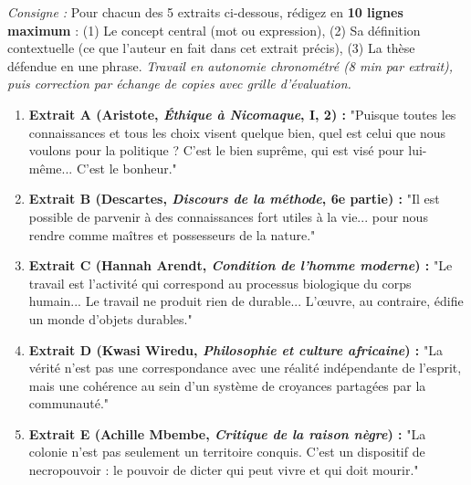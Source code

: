 \documentclass[11pt]{article}
\newcommand{\cle}[1]{{\popxbold\color{popdark}#1}}
\newcounter{popsec}
\newcounter{popsub}
\newcommand{\courssub}[1]{%
  \stepcounter{popsub}%
  \par\vspace{9pt}\noindent{\popxbold\fontsize{11.5}{13}\selectfont\color{popink}{\color{poporange}\thepopsec.\thepopsub}\hspace{6pt}#1}\par\nopagebreak\vspace{4pt}
}
\begin{document}
\courssub{Je m'entraîne}

\begin{exercice}
\emph{Consigne :} Pour chacun des 5 extraits ci-dessous, rédigez en \textbf{10 lignes maximum} : (1) Le \cle{concept central} (mot ou expression), (2) Sa \cle{définition contextuelle} (ce que l'auteur en fait dans cet extrait précis), (3) La \cle{thèse} défendue en une phrase. \emph{Travail en autonomie chronométré (8 min par extrait), puis correction par échange de copies avec grille d'évaluation.}

\begin{enumerate}
    \item \textbf{Extrait A (Aristote, \emph{Éthique à Nicomaque}, I, 2) :} "Puisque toutes les connaissances et tous les choix visent quelque bien, quel est celui que nous voulons pour la politique ? C'est le bien suprême, qui est visé pour lui-même... C'est le bonheur."
    \item \textbf{Extrait B (Descartes, \emph{Discours de la méthode}, 6e partie) :} "Il est possible de parvenir à des connaissances fort utiles à la vie... pour nous rendre comme \cle{maîtres et possesseurs de la nature}."
    \item \textbf{Extrait C (Hannah Arendt, \emph{Condition de l'homme moderne}) :} "Le travail est l'activité qui correspond au processus biologique du corps humain... Le travail ne produit rien de durable... L'œuvre, au contraire, édifie un monde d'objets durables."
    \item \textbf{Extrait D (Kwasi Wiredu, \emph{Philosophie et culture africaine}) :} "La vérité n'est pas une correspondance avec une réalité indépendante de l'esprit, mais une \cle{cohérence} au sein d'un système de croyances partagées par la communauté."
    \item \textbf{Extrait E (Achille Mbembe, \emph{Critique de la raison nègre}) :} "La \cle{colonie} n'est pas seulement un territoire conquis. C'est un dispositif de \cle{necropouvoir} : le pouvoir de dicter qui peut vivre et qui doit mourir."
\end{enumerate}
\end{exercice}
\end{document}
